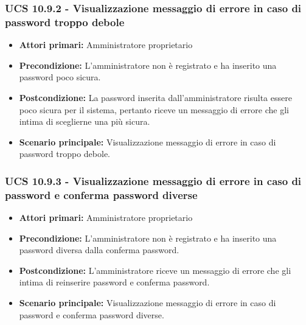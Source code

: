 \subsubsection{UCS 10.9.2 - Visualizzazione messaggio di errore in caso di password troppo debole}%
\begin{itemize}
\item \textbf{Attori primari:} Amministratore proprietario
\item \textbf{Precondizione:} L'amministratore non è registrato e ha inserito una password poco sicura.
\item \textbf{Postcondizione:} La password inserita dall'amministratore risulta essere poco sicura per il sistema, pertanto riceve un messaggio di errore che gli intima di sceglierne una più sicura.
\item \textbf{Scenario principale:} Visualizzazione messaggio di errore in caso di password troppo debole.
\end{itemize}

\subsubsection{UCS 10.9.3 - Visualizzazione messaggio di errore in caso di password e conferma password diverse}%
\begin{itemize}
\item \textbf{Attori primari:} Amministratore proprietario
\item \textbf{Precondizione:} L'amministratore non è registrato e ha inserito una password diversa dalla conferma password.
\item \textbf{Postcondizione:} L'amministratore riceve un messaggio di errore che gli intima di reinserire password e conferma password.
\item \textbf{Scenario principale:} Visualizzazione messaggio di errore in caso di password e conferma password diverse.
\end{itemize}

